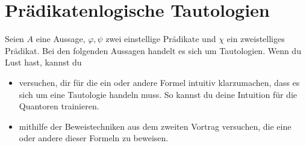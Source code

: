 \documentclass[12pt,BCOR1cm,ngerman,DIV15,fleqn,chapterprefix,headings=small]{ST1-book}
\begin{document}
 
 

 \section*{Prädikatenlogische Tautologien}
  Seien $A$ eine Aussage, $\varphi,\psi$ zwei einstellige Prädikate und $\chi$ ein zweistelliges Prädikat. Bei den folgenden Aussagen handelt es sich um Tautologien. Wenn du Lust hast, kannst du
 \begin{itemize}
  \item versuchen, dir für die ein oder andere Formel intuitiv klarzumachen, dass es sich um eine Tautologie handeln muss. So kannst du deine Intuition für die Quantoren trainieren.
  \item mithilfe der Beweistechniken aus dem zweiten Vortrag versuchen, die eine oder andere dieser Formeln zu beweisen.
 \end{itemize}
 \begingroup
 \allowdisplaybreaks
\end{document}

